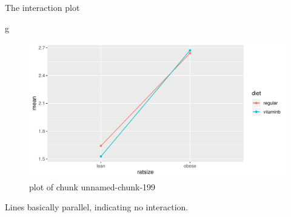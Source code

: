 \documentclass[ignorenonframetext,]{beamer}
\newenvironment{Shaded}{\begin{snugshade}}{\end{snugshade}}
\newcommand{\NormalTok}[1]{#1}
\begin{document}
\begin{frame}[fragile]{The interaction plot}
\protect\hypertarget{the-interaction-plot}{}

\begin{Shaded}
\begin{Highlighting}[]
\NormalTok{g}
\end{Highlighting}
\end{Shaded}

\begin{figure}
\centering
\includegraphics{figure/unnamed-chunk-199-1.pdf}
\caption{plot of chunk unnamed-chunk-199}
\end{figure}

Lines basically parallel, indicating no interaction.

\end{frame}
\end{document}
